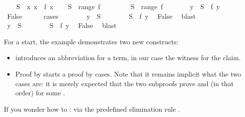 \begin{isabellebody}
%
\isadelimproof
%
\endisadelimproof
%
\isatagproof
{}\isamarkupfalse%
\isanewline
\ \ \isamarkupfalse%
\ {\isacharquery}S\ {\isacharequal}\ {\isachardoublequoteopen}{\isacharbraceleft}x{\isachardot}\ x\ {\isasymnotin}\ f\ x{\isacharbraceright}{\isachardoublequoteclose}\isanewline
\ \ \isamarkupfalse%
\ {\isachardoublequoteopen}{\isacharquery}S\ {\isasymnotin}\ range\ f{\isachardoublequoteclose}\isanewline
\ \ \isamarkupfalse%
\isanewline
\ \ \ \ \isamarkupfalse%
\ {\isachardoublequoteopen}{\isacharquery}S\ {\isasymin}\ range\ f{\isachardoublequoteclose}\isanewline
\ \ \ \ \isamarkupfalse%
\ \isamarkupfalse%
\ y\ \ {\isachardoublequoteopen}{\isacharquery}S\ {\isacharequal}\ f\ y{\isachardoublequoteclose}\ \isacommand{{\isachardot}{\isachardot}}\isamarkupfalse%
\isanewline
\ \ \ \ \isamarkupfalse%
\ False\isanewline
\ \ \ \ \isamarkupfalse%
\ cases\isanewline
\ \ \ \ \ \ \isamarkupfalse%
\ {\isachardoublequoteopen}y\ {\isasymin}\ {\isacharquery}S{\isachardoublequoteclose}\isanewline
\ \ \ \ \ \ \isamarkupfalse%
\ {\isacharbackquoteopen}{\isacharquery}S\ {\isacharequal}\ f\ y{\isacharbackquoteclose}\ \isamarkupfalse%
\ False\ \isamarkupfalse%
\ blast\isanewline
\ \ \ \ \isamarkupfalse%
\isanewline
\ \ \ \ \ \ \isamarkupfalse%
\ {\isachardoublequoteopen}y\ {\isasymnotin}\ {\isacharquery}S{\isachardoublequoteclose}\isanewline
\ \ \ \ \ \ \isamarkupfalse%
\ {\isacharbackquoteopen}{\isacharquery}S\ {\isacharequal}\ f\ y{\isacharbackquoteclose}\ \isamarkupfalse%
\ False\ \isamarkupfalse%
\ blast\isanewline
\ \ \ \ \isamarkupfalse%
\isanewline
\ \ \isamarkupfalse%
\isanewline
{}\isamarkupfalse%
%
\endisatagproof
{\isafoldproof}%
%
\isadelimproof
%
\endisadelimproof
%
\begin{isamarkuptext}%
\noindent
For a start, the example demonstrates two new constructs:
\begin{itemize}
\item {} introduces an abbreviation for a term, in our case
the witness for the claim.
\item Proof by  starts a proof by cases. Note that it remains
implicit what the two cases are: it is merely expected that the two subproofs
prove  and  (in that order)
for some .
\end{itemize}
If you wonder how to  :
via the predefined elimination rule .


\end{isamarkuptext}
\end{isabellebody}
